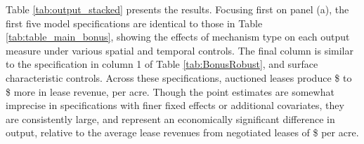 \documentclass[12pt]{article}
\newcommand{\inputy}[1]{\unskip}
\begin{document}
Table \ref{tab:output_stacked} presents the results. Focusing first on panel (a), the first five model specifications are identical to those in Table \ref{tab:table_main_bonus}, showing the effects of mechanism type on each output measure under various spatial and temporal controls.  The final column is similar to the specification in column 1 of Table \ref{tab:BonusRobust}, and surface characteristic controls.  Across these specifications, auctioned leases produce \$\inputy{../output/estimates/lease_rev_min.tex} to \$\inputy{../output/estimates/lease_rev_max.tex} more in lease revenue, per acre. Though the point estimates are somewhat imprecise in specifications with finer fixed effects or additional covariates, they are consistently large, and represent an economically significant difference in output, relative to the average lease revenues from negotiated leases of \$\inputy{../output/estimates/negotiation_avg_revenue.tex} per acre. 
\end{document}

